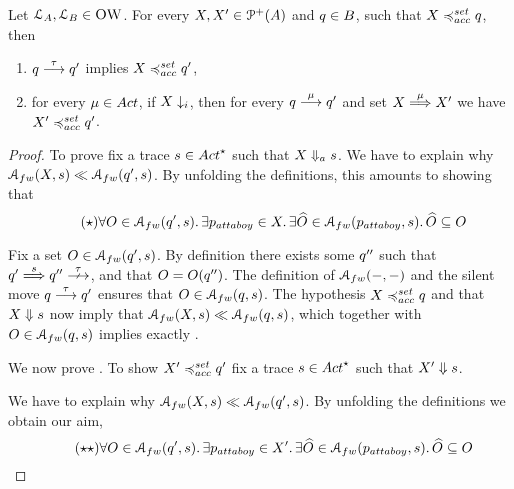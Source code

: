 \noindent%
\textbf{}
  Let $\mathcal{L}_A, \mathcal{L}_B \in \textsc{OW}$.
  For every
  $X, X' \in \mathcal{P}^{+}( A )$ and $ q \in B$,
  such that $X \accleqset \serverB$, then
  \begin{enumerate}
  \item
    $q \mathrel{\overset{ \tau }\longrightarrow} q'$ implies $X \accleqset \serverB'$,
  \item
    for every $\mu \in \Act$,
    if $X \downarrow_i$, then for every  $q \mathrel{\overset{\mu}\longrightarrow} q'$ and set $X \mathrel{\overset{\mu} \Longrightarrow} X'$
    we have $X' \accleqset \serverB'$.
  \end{enumerate}
  \newcommand{\attaboy}{\server_{\mathsf{attaboy}}}
  \begin{proof}
      To prove 
      fix a trace $\trace \in \Actfin$ such that
      $X \Downarrow_{a} s$.
      We have to explain why
      $\accht{ X }{ \trace } \ll \accht{ \serverB' }{ \trace }$.
      By unfolding the definitions, this amounts to showing that
      \begin{equation}
        \label{eq:attaboy-1}
        \tag{$\star$}
        \forall O \in \accht{ \serverB' }{\trace} \wehavethat
        \exists \attaboy \in X \suchthat
        \exists \widehat{O} \in \accht{ \attaboy }{ \trace } \suchthat
        \widehat{O} \subseteq O
      \end{equation}

      Fix a set $O \in \accht{\serverB'}{\trace}$.
      By definition there exists some $q''$ such that
      $\serverB' \wt{\trace} \serverB'' \stable$, and that $O =
      O(q'')$.
      The definition of $\accht{-}{-}$ and the silent move $q \mathrel{\overset{ \tau }\longrightarrow} q'$
      ensures that $O \in \accht{\serverB}{ \trace }$.
      The hypothesis $ X \accleqset \serverB $ and that
      $X \mathrel{\Downarrow}{ s } $ now imply that
      $\accht{ X }{ \trace } \ll \accht{ \serverB }{ \trace }$,
      which together with $ O \in \accht{\serverB}{ \trace }$
      implies exactly .


    We now prove .
    To show $X' \accleqset \serverB'$ fix a trace $\trace \in \Actfin$
    such that $X' \mathrel{\Downarrow} s$.


    We have to explain why $\accht{X}{\trace} \ll
    \accht{\serverB'}{\trace}$.
    By unfolding the definitions we obtain our aim,
      \begin{equation}
      \label{eq:aim}
      \tag{$\star\star$}
      \forall O \in \accht{ \serverB' }{ \trace } \wehavethat
      \exists \attaboy \in X' \suchthat
      \exists \widehat{ O } \in \accht{ \attaboy }{ \trace } \suchthat
      \widehat{ O } \subseteq O
    \end{equation}


\end{proof}
